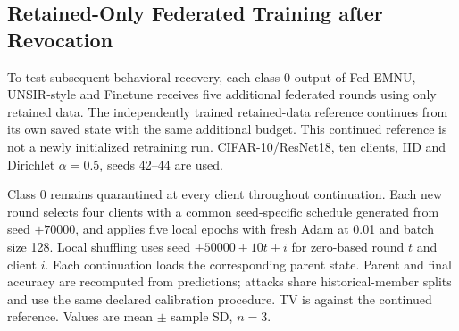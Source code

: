 \documentclass[software,article,submit,moreauthors]{Definitions/mdpi}
\begin{document}
\subsection{Retained-Only Federated Training after Revocation}

\label{sec:continuation}

To test subsequent behavioral recovery, each class-0 output of Fed-EMNU, UNSIR-style and Finetune receives five additional federated rounds using only retained data. The independently trained retained-data reference continues from its own saved state with the same additional budget. This continued reference is not a newly initialized retraining run. CIFAR-10/ResNet18, ten clients, IID and Dirichlet $\alpha=0.5$, seeds 42--44 are used.

Class 0 remains quarantined at every client throughout continuation. Each new round selects four clients with a common seed-specific schedule generated from seed $+70000$, and applies five local epochs with fresh Adam at 0.01 and batch size 128. Local shuffling uses seed $+50000+10t+i$ for zero-based round $t$ and client $i$. Each continuation loads the corresponding parent state. Parent and final accuracy are recomputed from predictions; attacks share historical-member splits and use the same declared calibration procedure. TV is against the continued reference. Values are mean $\pm$ sample SD, $n=3$.
\end{document}
